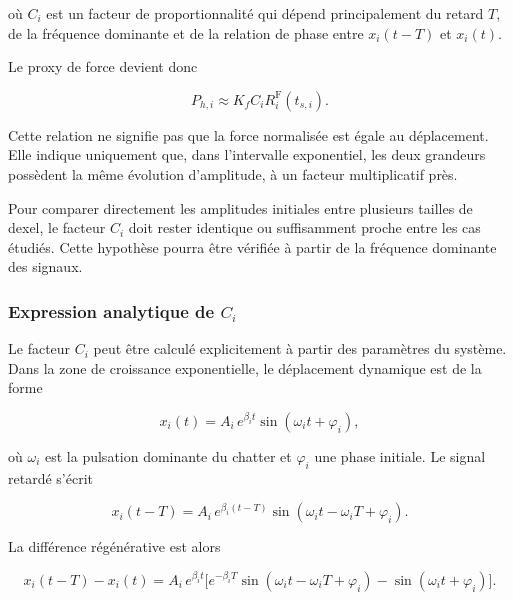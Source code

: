 \documentclass[
    11pt,
    a4paper
]{article}
\begin{document}
où \(C_i\) est un facteur de proportionnalité qui dépend principalement du
retard \(T\), de la fréquence dominante et de la relation de phase entre
\(x_i(t-T)\) et \(x_i(t)\).

Le proxy de force devient donc

\begin{equation}
    P_{h,i}
    \approx
    K_f C_i R_i^{\mathrm{F}}(t_{s,i}).
    \label{eq:proxy-amplitude-simplifie}
\end{equation}

Cette relation ne signifie pas que la force normalisée est égale au
déplacement. Elle indique uniquement que, dans l’intervalle exponentiel, les
deux grandeurs possèdent la même évolution d’amplitude, à un facteur
multiplicatif près.

Pour comparer directement les amplitudes initiales entre plusieurs tailles de
dexel, le facteur \(C_i\) doit rester identique ou suffisamment proche entre les
cas étudiés. Cette hypothèse pourra être vérifiée à partir de la fréquence
dominante des signaux.

\subsubsection{Expression analytique de \(C_i\)}
\label{subsubsec:expression-analytique-Ci}

Le facteur \(C_i\) peut être calculé explicitement à partir des paramètres du
système. Dans la zone de croissance exponentielle, le déplacement dynamique est
de la forme

\begin{equation}
    x_i(t) = A_i\,e^{\beta_i t}\sin(\omega_i t + \varphi_i),
    \label{eq:signal-exponentiel-sinusoidal}
\end{equation}

où \(\omega_i\) est la pulsation dominante du chatter et \(\varphi_i\) une phase
initiale. Le signal retardé s'écrit

\begin{equation}
    x_i(t-T) = A_i\,e^{\beta_i(t-T)}\sin(\omega_i t - \omega_i T + \varphi_i).
\end{equation}

La différence régénérative est alors

\begin{equation}
    x_i(t-T) - x_i(t)
    =
    A_i\,e^{\beta_i t}
    \bigl[
        e^{-\beta_i T}\sin(\omega_i t - \omega_i T + \varphi_i)
        -
        \sin(\omega_i t + \varphi_i)
    \bigr].
\end{equation}
\end{document}

